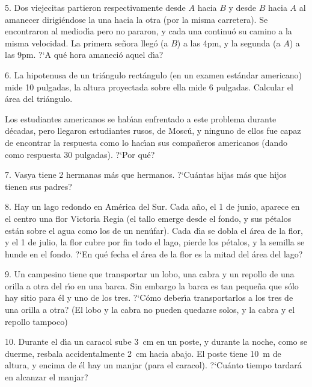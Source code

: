 \begin{problem}{5.}
	Dos viejecitas partieron respectivamente desde $A$ hacia $B$ y desde $B$ hacia $A$ al amanecer dirigi\'endose la
	una hacia la otra (por la misma carretera). Se encontraron al mediod\'{\i}a pero no pararon, y cada una continu\'o su
	camino a la misma velocidad. La primera se\~nora lleg\'o (a $B$) a las 4pm, y la segunda (a $A$) a las 9pm. ?`A qu\'e hora amaneci\'o aquel d\'{\i}a?
\end{problem}

\begin{problem}{6.}
	La hipotenusa de un tri\'angulo rect\'angulo (en un examen est\'andar americano) mide 10 pulgadas,
	la altura proyectada sobre ella mide 6 pulgadas. Calcular el \'area del tri\'angulo.

	Los estudiantes americanos se hab\'{\i}an enfrentado a este problema durante d\'ecadas, pero llegaron estudiantes rusos,
	de Mosc\'u, y ninguno de ellos fue capaz de encontrar la respuesta como lo hac\'{\i}an sus compa\~neros americanos
	(dando como respuesta 30 pulgadas). ?`Por qu\'e?
\end{problem}

\begin{problem}{7.}
	Vasya tiene 2 hermanas m\'as que hermanos. ?`Cu\'antas hijas m\'as que hijos tienen sus padres?
\end{problem}

\begin{problem}{8.}
	Hay un lago redondo en Am\'erica del Sur. Cada a\~no, el 1 de junio, aparece en el centro una flor Victoria Regia
	(el tallo emerge desde el fondo, y sus p\'etalos est\'an sobre el agua como los de un nen\'ufar). Cada d\'{\i}a se dobla
	el \'area de la flor, y el 1 de julio, la flor cubre por fin todo el lago, pierde los p\'etalos, y la semilla se hunde
	en el fondo. ?`En qu\'e fecha el \'area de la flor es la mitad del \'area del lago?
\end{problem}

\begin{problem}{9.}
	Un campesino tiene que transportar un lobo, una cabra y un repollo de una orilla a otra del r\'{\i}o en una barca.
	Sin embargo la barca es tan peque\~na que s\'olo hay sitio para \'el y uno de los tres. ?`C\'omo deber\'{\i}a
	transportarlos a los tres de una orilla a otra? (El lobo y la cabra no pueden quedarse solos, y la cabra y el repollo
	tampoco)
\end{problem}

\begin{problem}{10.}
	Durante el d\'{\i}a un caracol sube \SI{3}{\cm} en un poste, y durante la noche, como se duerme, resbala
	accidentalmente \SI{2}{\cm} hacia abajo. El poste tiene \SI{10}{\metre} de altura, y encima de \'el hay un manjar (para el caracol).
	?`Cu\'anto tiempo tardar\'a en alcanzar el manjar?
\end{problem}

